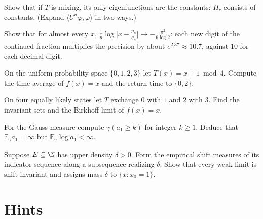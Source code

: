 \begin{exercise}[$\star\star$]\label{ex:mixingeigen}
Show that if $T$ is mixing, its only eigenfunctions are the constants: $H_c$ consists of constants. (Expand $\langle U^n\varphi,\varphi\rangle$ in two ways.)
\end{exercise}

\begin{exercise}[$\star\star$]\label{ex:approxrate}
Show that for almost every $x$, $\frac1n\log\bigl|x-\frac{p_n}{q_n}\bigr|\to-\frac{\pi^2}{6\log2}$: each new digit of the continued fraction multiplies the precision by about $e^{2.37}\approx10.7$, against $10$ for each decimal digit.
\end{exercise}

\begin{exercise}[$\star$]\label{ex:v11-ch10-cycle}
On the uniform probability space $\{0,1,2,3\}$ let $T(x)=x+1\bmod4$. Compute the time average of $f(x)=x$ and the return time to $\{0,2\}$.
\end{exercise}

\begin{exercise}[$\star\star$]\label{ex:v11-ch10-nonergodic}
On four equally likely states let $T$ exchange $0$ with $1$ and $2$ with $3$. Find the invariant sets and the Birkhoff limit of $f(x)=x$.
\end{exercise}

\begin{exercise}[$\star\star$]\label{ex:v11-ch10-gauss-tail}
For the Gauss measure compute $\gamma(a_1\ge k)$ for integer $k\ge1$. Deduce that $\mathbb E_\gamma a_1=\infty$ but $\mathbb E_\gamma\log a_1<\infty$.
\end{exercise}

\begin{exercise}[$\star\star$]\label{ex:v11-ch10-cylinders}
Suppose $E\subseteq\N$ has upper density $\delta>0$. Form the empirical shift measures of its indicator sequence along a subsequence realizing $\delta$. Show that every weak limit is shift invariant and assigns mass $\delta$ to $\{x:x_0=1\}$.
\end{exercise}

\section{Hints}

